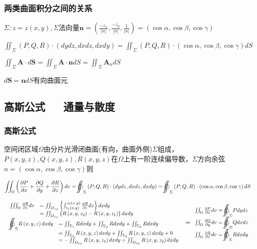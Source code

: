 \documentclass[UTF8]{ctexart}
\newcommand{\mb}[1]{\textbf{#1}}
\newcommand{\mf}[1]{\left( #1\right)}
\newcommand{\mfa}[1]{\left| #1\right|}
\newcommand{\mfb}[1]{\left\{ #1\right\}}
\newcommand{\q}{\quad}
\newcommand{\ma}[1]{\begin{array}{llll} #1 \end{array}}
\newcommand{\da}[2]{\frac{\partial #1}{\partial #2}}
\def\ooint{\displaystyle{{\bigcirc}\kern-12.5pt{\int}\kern-7.5pt{\int}}}
\begin{document}
\subsubsection{两类曲面积分之间的关系}




$\Sigma : z=z\mf{x,y},\Sigma$法向量$\mb{n}=\mf{\frac{-z_x}{\mfa{n}},\frac{-z_y}{\mfa{n}},\frac{1}{\mfa{n}}}=\mf{\cos \alpha,\cos \beta,\cos \gamma}$



$\iint_\Sigma \mf{P,Q,R} \cdot \mf{dydz,dxdz,dxdy}=\iint_\Sigma\mf{P,Q,R}\cdot\mf{\cos \alpha,\cos \beta,\cos \gamma}dS$









$\iint_\Sigma \mb{A} \cdot d \mb{S} =\iint_\Sigma \mb{A} \cdot \mb{n} d S =\iint_\Sigma \mb{A}_n  d S$

$d \mb{S}=\mb{n}dS$有向曲面元


\subsection{高斯公式 $\q$ 通量与散度}

\subsubsection{高斯公式}

空间闭区域$\Omega$由分片光滑闭曲面(有向，曲面外侧)$\Sigma$组成，$P\mf{x,y,z},Q\mf{x,y,z},R\mf{x,y,z}$在$\Omega$上有一阶连续偏导数，$\Sigma $方向余弦$n=\mf{\cos \alpha,\cos \beta,\cos \gamma}$则

$$\iint_\Omega\mf{\da{P}{x}+\da{Q}{y}+\da{R}{z}}dv=\ooint_\Sigma\mf{P,Q,R}\cdot \mf{dydz,dxdz,dxdy} =\ooint_\Sigma\mf{P,Q,R}\cdot \mf{\cos \alpha,\cos \beta,\cos \gamma}dS$$



\noindent
$\ma{
    \ma{
        \iiint_\Omega \da{R}{z}dv &=  \iint_{D_{xy}}\mfb{\int_{z_1\mf{x,y}}^{z_2\mf{x,y}}\da{R}{z}dz}dxdy\\
         &=\iint_{D_{xy}}\mfb{R\mf{x,y,z_2}-R\mf{x,y,z_1}}dxdy
    }\\
    \ma{ \ooint_\Sigma R\mf{x,y,z}dxdy &=\iint_{\Sigma_1}R dxdy+\iint_{\Sigma_2}R dxdy+\iint_{\Sigma_3}R dxdy\\
        &= \iint_{\Sigma_1}R\mf{x,y,z}dxdy+\iint_{\Sigma_2}R\mf{x,y,z}dxdy+0\\
        &=-\iint_{D_{xy}}R\mf{x,y,z_1}dxdy +\iint_{D_{xy}}R\mf{x,y,z_2}dxdy
    }

}\Rightarrow \ma{
    \iint_\Omega \da{P}{x}dv=\ooint_\Sigma P dydz\\
    \iint_\Omega \da{Q}{y}dv=\ooint_\Sigma Q dxdz\\
    \iint_\Omega \da{R}{z}dv=\ooint_\Sigma R dxdy\\
}$
\end{document}
